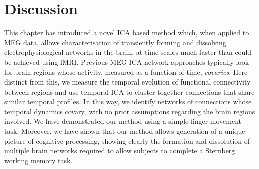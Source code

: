 \section{Discussion}
This chapter has introduced a novel ICA based method which, when applied to MEG data, allows characterisation of transiently forming and dissolving electrophysiological networks in the brain, at time-scales much faster than could be achieved using fMRI. Previous MEG-ICA-network approaches typically look for brain regions whose activity, measured as a function of time, \textit{covaries}. Here distinct from this, we measure the temporal evolution of functional connectivity between regions and use temporal ICA to cluster together connections that share similar temporal profiles. In this way, we identify networks of connections whose temporal dynamics covary, with no prior assumptions regarding the brain regions involved. We have demonstrated our method using a simple finger movement task. Moreover, we have shown that our method allows generation of a unique picture of cognitive processing, showing clearly the formation and dissolution of multiple brain networks required to allow subjects to complete a Sternberg working memory task. 

